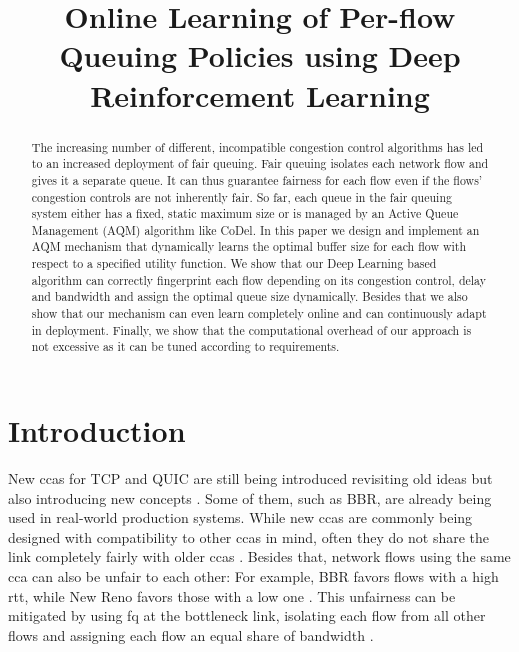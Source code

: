 \documentclass[conference]{IEEEtran}
\begin{document}
\title{Online Learning of Per-flow Queuing Policies using Deep Reinforcement Learning}

\author{
}

\maketitle

\begin{abstract}
The increasing number of different, incompatible congestion control algorithms has led to an increased deployment of fair queuing. Fair queuing isolates each network flow and gives it a separate queue. It can thus guarantee fairness for each flow even if the flows' congestion controls are not inherently fair. So far, each queue in the fair queuing system either has a fixed, static maximum size or is managed by an Active Queue Management (AQM) algorithm like CoDel. In this paper we design and implement an AQM mechanism that dynamically learns the optimal buffer size for each flow with respect to a specified utility function. We show that our Deep Learning based algorithm can correctly fingerprint each flow depending on its congestion control, delay and bandwidth and assign the optimal queue size dynamically. Besides that we also show that our mechanism can even learn completely online and can continuously adapt in deployment. Finally, we show that the computational overhead of our approach is not excessive as it can be tuned according to requirements. 
\end{abstract}

\section{Introduction}
\label{sec:intro}

New \glspl{cca} for TCP and QUIC are still being introduced revisiting old ideas but also introducing new concepts \cite{dong_pcc_2018, cardwell_bbr:_2016, hock_tcp_2017, bachl_cocoa_2019, jay_deep_2019}. Some of them, such as BBR, are already being used in real-world production systems. While new \glspl{cca} are commonly being designed with compatibility to other \glspl{cca} in mind, often they do not share the link completely fairly with older \glspl{cca} \cite{hock_experimental_2017, fejes_who_2019, fejes_incompatibility_2020}. Besides that, network flows using the same \gls{cca} can also be unfair to each other: For example, BBR favors flows with a high \gls{rtt}, while New Reno favors those with a low one \cite{turkovic_interactions_2019,turkovic_fifty_2019}. This unfairness can be mitigated by using \gls{fq} at the bottleneck link, isolating each flow from all other flows and assigning each flow an equal share of bandwidth \cite{dumazet_pkt_sched:_2013}. 
\end{document}
